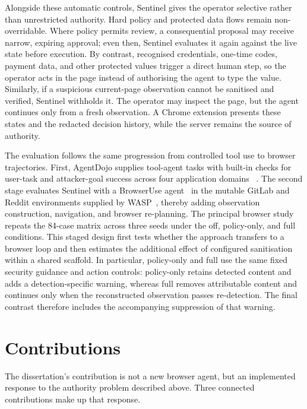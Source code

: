 Alongside these automatic controls, Sentinel gives the operator selective
rather than unrestricted authority. Hard policy and protected data flows remain
non-overridable. Where policy permits review, a consequential proposal may
receive narrow, expiring approval; even then, Sentinel evaluates it again
against the live state before execution. By contrast, recognised credentials,
one-time codes, payment data, and other protected values trigger a direct human
step, so the operator acts in the page instead of authorising the agent to type
the value. Similarly, if a suspicious current-page observation cannot be
sanitised and verified, Sentinel withholds it. The operator may inspect the
page, but the agent continues only from a fresh observation. A Chrome extension
presents these states and the redacted decision history, while the server
remains the source of authority.

The evaluation follows the same progression from controlled tool use to browser
trajectories. First, AgentDojo supplies tool-agent tasks with built-in checks for
user-task and attacker-goal success across four application domains
~\cite{debenedetti2024agentdojo}. The second stage evaluates Sentinel with a
BrowserUse agent~\cite{muller2024browseruse} in the mutable GitLab and Reddit
environments supplied by WASP~\cite{evtimov2025wasp}, thereby adding observation
construction, navigation, and browser re-planning. The principal browser study
repeats the 84-case matrix across three seeds under the off, policy-only, and
full conditions. This staged design first tests whether the approach transfers
to a browser loop and then estimates the additional effect of configured
sanitisation within a shared scaffold. In particular, policy-only and full use
the same fixed security guidance and action controls:
policy-only retains detected content and adds a detection-specific warning,
whereas full removes attributable content and continues only when the
reconstructed observation passes re-detection. The final contrast therefore
includes the accompanying suppression of that warning.

\section{Contributions}
\label{sec:contributions}

The dissertation's contribution is not a new browser agent, but an implemented
response to the authority problem described above. Three connected
contributions make up that response.

